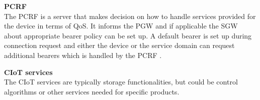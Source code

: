 \textbf{\gls{PCRF}}\\
The \gls{PCRF} is a server that makes decision on how to handle services provided for the device in terms of \gls{QoS}. It informs the \gls{PGW} and if applicable the \gls{SGW} about appropriate bearer policy can be set up. A default bearer is set up during connection request and either the device or the service domain can request additional bearers which is handled by the \gls{PCRF} \citep[ch. 3]{book_LTE_for_UMTS}.

\textbf{\gls{CIoT} services}\\
The \gls{CIoT} services are typically storage functionalities, but could be control algorithms or other services needed for specific products. 

